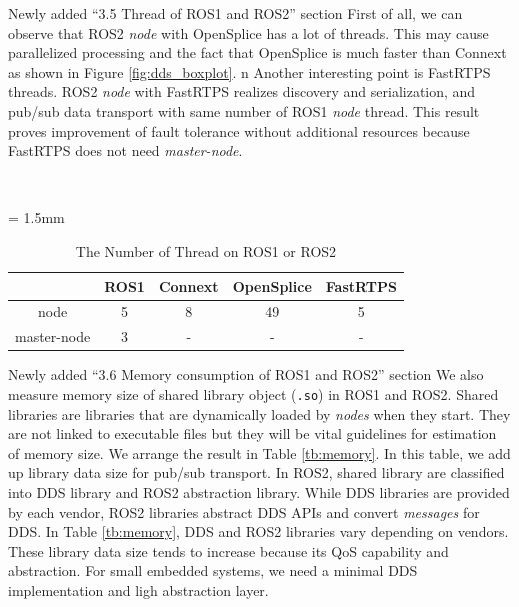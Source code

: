 \documentclass{article}
\begin{document}
\begin{enumerate}
\begin{itembox}[|]{Newly added ``3.5 Thread of ROS1 and ROS2'' section}
    First of all, we can observe that ROS2 \emph{node} with OpenSplice has a lot of threads.
    This may cause parallelized processing and the fact that OpenSplice is much faster than Connext as shown in Figure \ref{fig:dds_boxplot}.
    n
    Another interesting point is FastRTPS threads.
    ROS2 \emph{node} with FastRTPS realizes discovery and serialization, and pub/sub data transport with same number of ROS1 \emph{node} thread.
    This result proves improvement of fault tolerance without additional resources because FastRTPS does not need \emph{master-node}.
  \end{itembox}\\
  \setcounter{table}{5}
  \begin{table}[H]
    \caption{\label{tb:thread}The Number of Thread on ROS1 or ROS2}
    \centering
    \tabcolsep = 1.5mm              %
    \begin{tabular}{c|cccc}
      \hline
      & ROS1 & Connext & OpenSplice & FastRTPS \\
      \hline
      \hline
      node & 5 & 8 & 49 & 5 \\
      master-node & 3 & - & - & - \\
      \hline
    \end{tabular}
  \end{table}
  \begin{itembox}[|]{Newly added ``3.6 Memory consumption of ROS1 and ROS2'' section}
    We also measure memory size of shared library object (\texttt{.so}) in ROS1 and ROS2.
    Shared libraries are libraries that are dynamically loaded by \emph{nodes} when they start.
    They are not linked to executable files but they will be vital guidelines for estimation of memory size.
    We arrange the result in Table \ref{tb:memory}.
    In this table, we add up library data size for pub/sub transport.
    In ROS2, shared library are classified into DDS library and ROS2 abstraction library.
    While DDS libraries are provided by each vendor, ROS2 libraries abstract DDS APIs and convert \emph{messages} for DDS.
    In Table \ref{tb:memory}, DDS and ROS2 libraries vary depending on vendors.
    These library data size tends to increase because its QoS capability and abstraction.
    For small embedded systems, we need a minimal DDS implementation and ligh abstraction layer.
  \end{itembox}\\
  \begin{table}[H]
    \caption{Memory of .so Files for ROS1 and ROS} 
    \centering

\end{table}
\end{enumerate}
\end{document}
